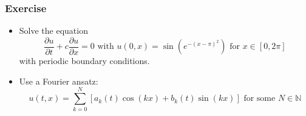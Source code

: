 \documentclass[]{beamer}
\newcommand{\N}{\mathbb{N}}
\newcommand{\myvec}[1]{\mathbf{#1}} %
\newcommand{\pd}[2]{\frac{\partial #1}{\partial #2}}
\begin{document}

% 
% 

\begin{frame}
  \frametitle{Exercise}
  \begin{itemize}
  \item Solve the equation
    $$\pd{u}{t} + c \pd{u}{x} = 0\text{ with }u(0,x)=\sin\left(e^{-(x-\pi)^2}\right)\text{ for }x\in[0,2\pi]$$
    with periodic boundary conditions.
  \item Use a Fourier ansatz:
    $$u(t,x) = \sum_{k=0}^N \left[a_k(t) \cos(kx) + b_k(t) \sin(kx)\right]\text{ for some }N\in\N$$
  \end{itemize}
\end{frame}
\end{document}
